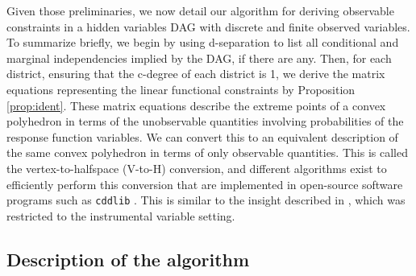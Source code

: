 \documentclass[12pt]{article}
\begin{document}
Given those preliminaries, we now detail our algorithm for deriving observable constraints in a hidden variables DAG with discrete and finite observed variables. To summarize briefly, we begin by using d-separation to list all conditional and marginal independencies implied by the DAG, if there are any. Then, for each district, ensuring that the c-degree of each district is 1, we derive the matrix equations representing the linear functional constraints by Proposition \ref{prop:ident}. These matrix equations describe the extreme points of a convex polyhedron in terms of the unobservable quantities involving probabilities of the response function variables. We can convert this to an equivalent description of the same convex polyhedron in terms of only observable quantities. This is called the vertex-to-halfspace (V-to-H) conversion, and different algorithms exist to efficiently perform this conversion that are implemented in open-source software programs such as \texttt{cddlib} \citep{cdd}. This is similar to the insight described in \citet{bonet2001instrumentality}, which was restricted to the instrumental variable setting.

\subsection{Description of the algorithm} \label{algorithm}
\end{document}
